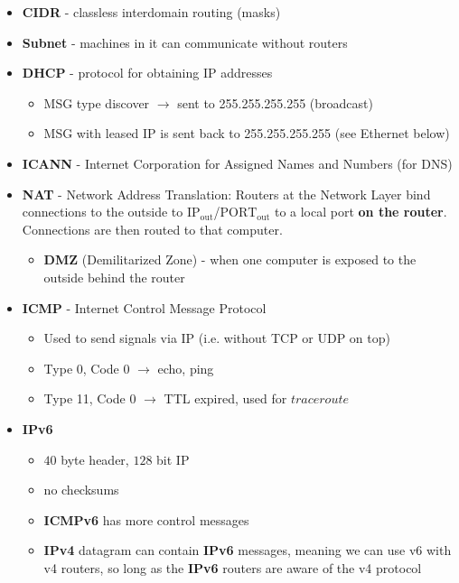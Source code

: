 \documentclass{article}
\begin{document}
\begin{itemize}
    \item \textbf{CIDR} - classless interdomain routing (masks)
    \item \textbf{Subnet} - machines in it can communicate without routers
    \item \textbf{DHCP} - protocol for obtaining IP addresses
    \begin{itemize}
        \item MSG type discover $\rightarrow$ sent to 255.255.255.255 (broadcast)
        \item MSG with leased IP is sent back to 255.255.255.255 (see Ethernet below)
    \end{itemize}
    \item \textbf{ICANN} - Internet Corporation for Assigned Names and Numbers (for DNS)
    \item \textbf{NAT} - Network Address Translation: Routers at the Network Layer bind connections to the outside to $\text{IP}_{\text{out}}$/$\text{PORT}_{\text{out}}$ to a local port \textbf{on the router}. Connections are then routed to that computer.
    \begin{itemize}
        \item \textbf{DMZ} (Demilitarized Zone) - when one computer is exposed to the outside behind the router
    \end{itemize}
    \item \textbf{ICMP} - Internet Control Message Protocol
    \begin{itemize}
        \item Used to send signals via IP (i.e. without TCP or UDP on top)
        \item Type 0, Code 0 $\rightarrow$ echo, ping
        \item Type 11, Code 0 $\rightarrow$ TTL expired, used for $traceroute$
    \end{itemize}
    \item \textbf{IPv6}
    \begin{itemize}
        \item $40$ byte header, $128$ bit IP
        \item no checksums
        \item \textbf{ICMPv6} has more control messages
        \item \textbf{IPv4} datagram can contain \textbf{IPv6} messages, meaning we can use v6 with v4 routers, so long as the \textbf{IPv6} routers are aware of the v4 protocol
    \end{itemize}
\end{itemize}
\end{document}
